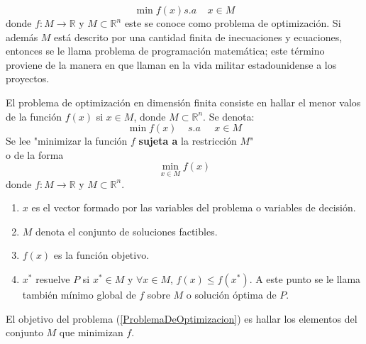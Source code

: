 \documentclass[10pt,twoside]{SelfArx} %
\begin{document}
  \begin{equation}
  \min f(x) s.a\;\;\;\; x\in M
  \end{equation}
  donde $ f:M\rightarrow\mathbb{R} $ y $ M\subset\mathbb{R}^{n} $ este se conoce como problema de optimización. Si además $ M $ está descrito por una cantidad finita de inecuaciones y ecuaciones,
  entonces se le llama problema de programación matemática; este término proviene de la manera en que llaman en la vida militar estadounidense a los
  proyectos.
  \begin{thm}
  	El problema de optimización en dimensión finita consiste en hallar el menor valos de la función $ f(x) $ si $ x\in M $, donde $ M\subset\mathbb{R}^{n} $. Se denota:
  	\begin{equation}
  	 \min f(x) \;\;\;\; s.a\;\;\;\;\; x\in M\label{ProblemaDeOptimizacion}
  	\end{equation}
  	Se lee "minimizar la funci\'on $ f $ \textbf{sujeta a} la restricci\'on $ M $"\\
  	o de la forma
  	\begin{equation}
  	 \min_{x\in M} f(x)
  	\end{equation}
  	 donde $ f:M\rightarrow\mathbb{R} $ y $ M\subset\mathbb{R}^{n} $.
  \end{thm}
  \begin{enumerate}
	\item   	$ x $ es el vector formado por las variables del problema o variables de decisión.
  	\item   	$ M $ denota el conjunto de soluciones factibles.

	\item   	$ f(x) $ es la función objetivo.
  	\item $ x^{*} $ resuelve $ P $ si $ x^{*}\in M $ y $ \forall x\in M $, $ f(x)\leq f(x^{*}) $. A este punto se le llama también \textsf{mínimo global de $ f $ sobre $ M $} o \textsf{solución óptima de $ P $}.
  \end{enumerate}
  El objetivo del problema (\ref{ProblemaDeOptimizacion}) es hallar los elementos del conjunto $ M $ que minimizan $ f $.
\end{document}
